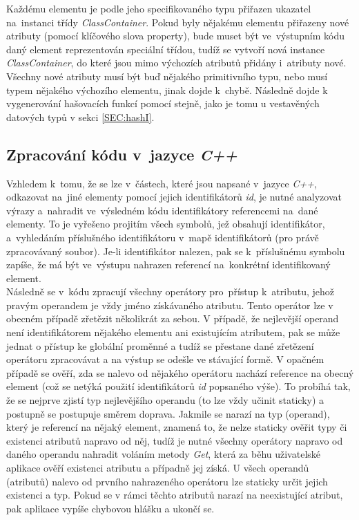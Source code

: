 \documentclass[11pt,twoside,a4paper]{book}
\begin{document}
Každému elementu je podle jeho specifikovaného typu přiřazen ukazatel na~instanci třídy \textit{ClassContainer}. Pokud byly nějakému elementu přiřazeny nové atributy (pomocí klíčového slova property), bude muset být ve~výstupním kódu daný element reprezentován speciální třídou, tudíž se vytvoří nová instance \textit{ClassContainer}, do které jsou mimo výchozích atributů přidány i~atributy nové. Všechny nové atributy musí být buď nějakého primitivního typu, nebo musí typem nějakého výchozího elementu, jinak dojde k~chybě. Následně dojde k vygenerování hašovacích funkcí pomocí stejně, jako je tomu u vestavěných datových typů v sekci \ref{SEC:hashI}.

\subsection{Zpracování kódu v~jazyce \textit{C++}}
Vzhledem k~tomu, že se lze v~částech, které jsou napsané v~jazyce \textit{C++}, odkazovat na~jiné elementy pomocí jejich identifikátorů \textit{id}, je nutné analyzovat výrazy a~nahradit ve~výsledném kódu identifikátory referencemi na~dané elementy. To je vyřešeno projitím všech symbolů, jež obsahují identifikátor, a~vyhledáním příslušného identifikátoru v~mapě identifikátorů (pro právě zpracovávaný soubor). Je-li identifikátor nalezen, pak se k~příslušnému symbolu zapíše, že má být ve~výstupu nahrazen referencí na~konkrétní identifikovaný element.\\
Následně se v~kódu zpracují všechny operátory  pro~přístup k~atributu, jehož pravým operandem je vždy jméno získávaného atributu. Tento operátor lze v obecném případě zřetězit několikrát za sebou. V případě, že nejlevější operand není identifikátorem nějakého elementu ani existujícím atributem, pak se může jednat o přístup ke globální proměnné a tudíž se přestane dané zřetězení operátoru  zpracovávat a na výstup se odešle ve stávající formě. V opačném případě se ověří, zda se nalevo od nějakého operátoru  nachází reference na obecný element (což se netýká použití identifikátorů \textit{id} popsaného výše). To probíhá tak, že se nejprve zjistí typ nejlevějšího operandu (to lze vždy učinit staticky) a postupně se postupuje směrem doprava. Jakmile se narazí na typ (operand), který je referencí na nějaký element, znamená to, že nelze staticky ověřit typy či existenci atributů napravo od něj, tudíž je nutné všechny operátory  napravo od daného operandu nahradit voláním metody \textit{Get}, která za běhu uživatelské aplikace ověří existenci atributu a případně jej získá. U všech operandů (atributů) nalevo od prvního nahrazeného operátoru lze staticky určit jejich existenci a typ. Pokud se v rámci těchto atributů narazí na neexistující atribut, pak aplikace vypíše chybovou hlášku a ukončí se.%
\end{document}
